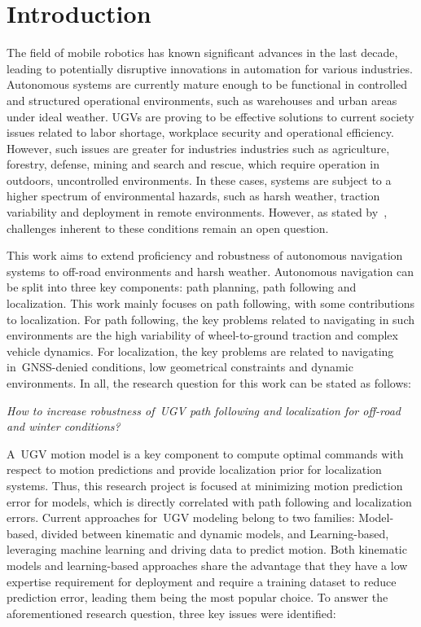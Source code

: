 \section{Introduction}
\label{sec:introduction}

The field of mobile robotics has known significant advances in the last decade, leading to potentially disruptive innovations in automation for various industries.
Autonomous systems are currently mature enough to be functional in controlled and structured operational environments, such as warehouses and urban areas under ideal weather.
\acp{UGV} are proving to be effective solutions to current society issues related to labor shortage, workplace security and operational efficiency. 
However, such issues are greater for industries industries such as agriculture, forestry, defense, mining and search and rescue,  which require operation in outdoors, uncontrolled environments.
In these cases, systems are subject to a higher spectrum of environmental hazards, such as harsh weather, traction variability and deployment in remote environments.
However, as stated by~\citet{VanBrummelen2018}, challenges inherent to these conditions remain an open question.

This work aims to extend proficiency and robustness of autonomous navigation systems to off-road environments and harsh weather. 
Autonomous navigation can be split into three key components: path planning, path following and localization. 
This work mainly focuses on path following, with some contributions to localization.
For path following, the key problems related to navigating in such environments are the high variability of wheel-to-ground traction and complex vehicle dynamics.
For localization, the key problems are related to navigating in~\ac{GNSS}-denied conditions, low geometrical constraints and dynamic environments.
In all, the research question for this work can be stated as follows:

\begin{center}
	\emph{
		How to increase robustness of~\ac{UGV} path following and localization for off-road and winter conditions?
	}
\end{center}

A~\ac{UGV} motion model is a key component to compute optimal commands with respect to motion predictions and provide localization prior for localization systems. %
Thus, this research project is focused at minimizing motion prediction error for models, which is directly correlated with path following and localization errors. 
Current approaches for~\ac{UGV} modeling belong to two families: Model-based, divided between kinematic and dynamic models, and Learning-based, leveraging machine learning and driving data to predict motion.
Both kinematic models and learning-based approaches share the advantage that they have a low expertise requirement for deployment and require a training dataset to reduce prediction error, leading them being the most popular choice.
To answer the aforementioned research question, three key issues were identified:

